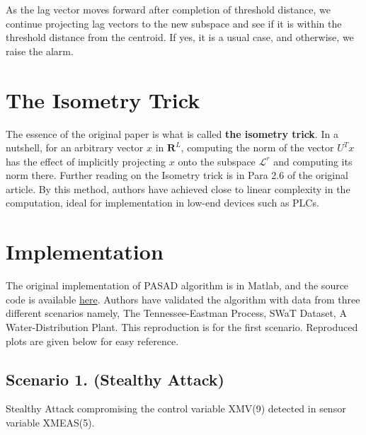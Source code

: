 As the lag vector moves forward after completion of threshold distance, we continue projecting lag vectors to the new subspace and see if it is within the threshold distance from the centroid. If yes, it is a usual case, and otherwise, we raise the alarm.

\section*{The Isometry Trick}

The essence of the original paper\supercite{Pasad:2018} is what is called \textbf{the isometry trick}.  In a nutshell, for an arbitrary vector $x$ in $\mathbf{R}^L$, computing the norm of the vector $U^Tx$ has the effect of implicitly projecting $x$ onto the subspace $\mathcal{L}^r$ and computing its norm there. Further reading on the Isometry trick is in Para 2.6 of the original article. By this method, authors have achieved close to linear complexity in the computation, ideal for implementation in low-end devices such as PLCs. 

\section*{Implementation}

The original implementation of PASAD algorithm is in Matlab, and the source code is available \href{https://github.com/mikeliturbe/pasad}{here}. Authors have validated the algorithm with data from three different scenarios namely, The Tennessee-Eastman Process, SWaT Dataset, A Water-Distribution Plant. This reproduction is for the first scenario. Reproduced plots are given below for easy reference.

\subsection*{Scenario 1. (Stealthy Attack)}

Stealthy Attack compromising the control variable XMV(9) detected in sensor variable XMEAS(5). 

